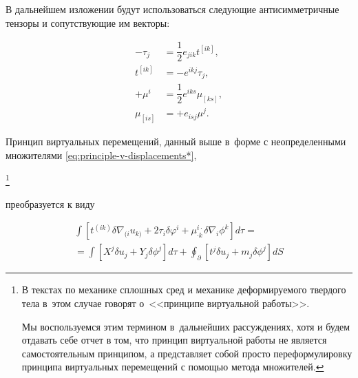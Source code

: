 В дальнейшем изложении будут использоваться следующие антисимметричные тензоры и сопутствующие им векторы:

\begin{equation}

\begin{aligned}

-\tau_j&=\dfrac{1}{2}e_{jik}t^{[ik]},\\

t^{[ik]}&=-e^{ikj}\tau_j,\\

+\mu^i&=\dfrac{1}{2}e^{iks}\mu_{[ks]},\\

\mu_{[is]}&=+e_{isj}\mu^j.

\end{aligned}

\end{equation}









\smallskip





%

Принцип виртуальных перемещений, данный выше в~форме с неопределенными множителями \eqref{eq:principle-v-displacements*},%

\footnote{В текстах по механике сплошных сред и механике деформируемого твердого тела в~этом случае говорят о~<<принципе виртуальной работы>>. 

Мы воспользуемся этим термином в~дальнейших рассуждениях, хотя и будем отдавать себе отчет в том, что принцип виртуальной работы не является самостоятельным принципом, а представляет собой просто переформулировку принципа виртуальных перемещений с помощью метода множителей.}\!\!

преобразуется к виду

\begin{multline}

\int\left[{t^{(ik)}\delta\nabla_{(i}u_{k)}+2\tau_i\delta\varphi^i+\mu^{i\cdot}_{\cdot k}\delta\nabla_i\phi^k}\right]d\tau=\\

%

=\int\left[{X^j\delta u_j+Y_j\delta\phi^j}\right]d\tau+\oint _\partial\left[{t^j\delta u_j+m_j\delta\phi^j}\right]dS

\label{eq:principle-v-work-1}

\end{multline}

